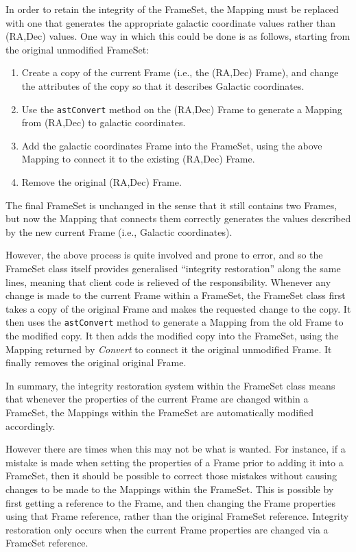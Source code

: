 \documentclass[final,authoryear,5p,times,twocolumn]{elsarticle}
\begin{document}
In order to retain the integrity of the FrameSet, the Mapping must
be replaced with one that generates the appropriate galactic coordinate
values rather than (RA,Dec) values. One way in which this could be done is as
follows, starting from the original unmodified FrameSet:

\begin{enumerate}
\item Create a copy of the current Frame (i.e., the (RA,Dec) Frame), and
change the attributes of the copy so that it describes Galactic
coordinates.
\item Use the \texttt{astConvert} method on the (RA,Dec) Frame to generate a
Mapping from (RA,Dec) to galactic coordinates.
\item Add the galactic coordinates Frame into the FrameSet, using the
above Mapping to connect it to the existing (RA,Dec) Frame.
\item Remove the original (RA,Dec) Frame.
\end{enumerate}

The final FrameSet is unchanged in the sense that it still contains two
Frames, but now the Mapping that connects them correctly generates the values
described by the new current Frame (i.e., Galactic coordinates).

However, the above process is quite involved and prone to error, and so
the FrameSet class itself provides generalised ``integrity restoration''
along the same lines, meaning that client code is relieved of the
responsibility. Whenever any change is made to the current Frame within a
FrameSet, the FrameSet class first takes a copy of the original Frame and
makes the requested change to the copy. It then uses the \texttt{astConvert}
method to generate a Mapping from the old Frame to the modified copy. It
then adds the modified copy into the FrameSet, using the Mapping returned
by \emph{Convert} to connect it the original unmodified Frame. It finally
removes the original original Frame.

In summary, the integrity restoration system within the FrameSet class
means that whenever the properties of the current Frame are changed within a
FrameSet, the Mappings within the FrameSet are automatically modified
accordingly.

However there are times when this may not be what is wanted. For
instance, if a mistake is made when setting the properties of a Frame
prior to adding it into a FrameSet, then it should be possible to correct
those mistakes without causing changes to be made to the Mappings within
the FrameSet. This is possible by first getting a reference to the Frame,
and then changing the Frame properties using that Frame reference, rather
than the original FrameSet reference. Integrity restoration only occurs
when the current Frame properties are changed via a FrameSet reference.
\end{document}
